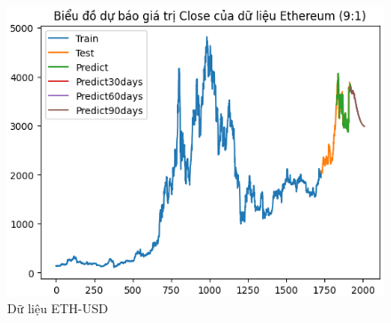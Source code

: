 \documentclass[conference]{IEEEtran}
\begin{document}
\begin{figure}[H]
\begin{minipage}{0.15\textwidth}
    \includegraphics[width=1\textwidth]{Figure/RNN_ETH91.png}
    \end{minipage}
    \caption{Dữ liệu ETH-USD}
    \label{fig:1}
\end{figure}
\end{document}
